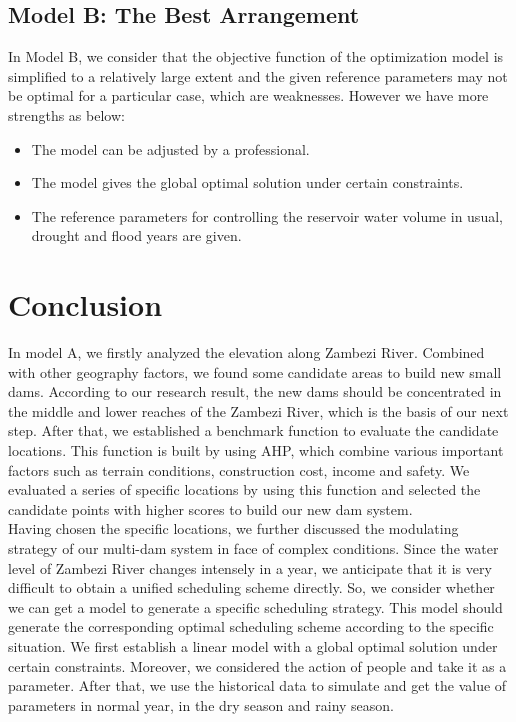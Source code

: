 \documentclass{mcmthesis}
\begin{document}
\subsection{Model B: The Best Arrangement}
In Model B, we consider that the objective function of the optimization model is simplified to a relatively large extent and the given reference parameters may not be optimal for a particular case, which are weaknesses. However we have more strengths as below:
\begin{itemize}
  \item The model can be adjusted by a professional.
  \item The model gives the global optimal solution under certain constraints.
  \item The reference parameters for controlling the reservoir water volume in usual, drought and flood years are given.
\end{itemize}

\section{Conclusion}
\indent \indent In model A, we firstly analyzed the elevation along Zambezi River. Combined with other geography factors, we found some candidate areas to build new small dams. According to our research result, the new dams should be concentrated in the middle and lower reaches of the Zambezi River, which is the basis of our next step. After that, we established a benchmark function to evaluate the candidate locations. This function is built by using AHP, which combine various important factors such as terrain conditions, construction cost, income and safety. We evaluated a series of specific locations by using this function and selected the candidate points with higher scores to build our new dam system.\\
\indent Having chosen the specific locations, we further discussed the modulating strategy of our multi-dam system in face of complex conditions. Since the water level of Zambezi River changes intensely in a year, we anticipate that it is very difficult to obtain a unified scheduling scheme directly. So, we consider whether we can get a model to generate a specific scheduling strategy. This model should generate the corresponding optimal scheduling scheme according to the specific situation. We first establish a linear model with a global optimal solution under certain constraints. Moreover, we considered the action of people and take it as a parameter. After that, we use the historical data to simulate and get the value of parameters in normal year, in the dry season and rainy season.
\end{document}
